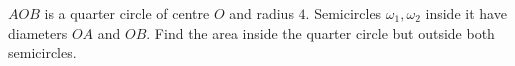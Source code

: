$AOB$ is a quarter circle of centre $O$ and radius $4$. Semicircles $\omega_1,\omega_2$ inside it have diameters $OA$ and $OB$. Find the area inside the quarter circle but outside both semicircles.
